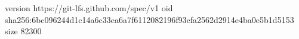 version https://git-lfs.github.com/spec/v1
oid sha256:6bc096244d1c14a6c33ea6a7f6112082196f93efa2562d2914e4ba0e5b1d5153
size 82300
